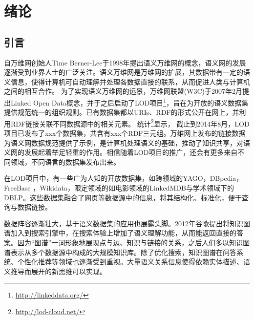 \chapter{绪论}
\label{cha:intro}

\section{引言}

自万维网创始人Time Berner-Lee于1998年提出语义万维网的概念\cite{berners1998semantic}，语义网的发展逐渐受到业界人士的广泛关注。语义万维网是万维网的扩展，其数据带有一定的语义信息，使得计算机可自动理解并处理各数据直接的联系，从而促进人类与计算机之间的相互合作。
为了实现语义万维网的远景，万维网联盟(W3C)于2007年2月提出Linked Open Data概念，并于之后启动了LOD项目\footnote{\url{http://linkeddata.org/}}，旨在为开放的语义数据集提供规范统一的组织规则。已有数据集都以URIs、RDF的形式公开在网上，并利用RDF链接关联不同数据源中的相关元素\cite{bizer2009linked}。
统计\footnote{\url{http://lod-cloud.net/}}显示，
截止到2014年8月，LOD项目已发布了xxx个数据集，共含有xxx个RDF三元组。万维网上发布的链接数据为语义网数据规范提供了示例，是计算机处理语义的基础，推动了知识共享，对语义网的发展起着举足轻重的作用。相信随着LOD项目的推广，还会有更多来自不同领域，不同语言的数据集发布出来。

在LOD项目中，有一些广为人知的开放数据集，如跨领域的YAGO\cite{suchanek2007yago,suchanek2008yago,hoffart2013yago2,mahdisoltani2014yago3}，DBpedia\cite{auer2007dbpedia,bizer2009dbpedia,lehmann2015dbpedia}，FreeBase \cite{bollacker2008freebase}，Wikidata\cite{vrandevcic2014wikidata,erxleben2014introducing}，限定领域的如电影领域的LinkedMDB\cite{hassanzadeh2009linked}与学术领域下的DBLP。这些数据集融合了网页等数据源中的信息，将其结构化、标准化，便于查询与数据链接。

数据阵容逐渐壮大，基于语义数据集的应用也展露头脚。2012年谷歌提出将知识图谱\cite{singhal2012introducing}加入到搜索引擎中，在搜索体验上增加了语义理解功能，从而能返回直接的答案。因为“图谱”一词形象地展现点与边、知识与链接的关系，之后人们多以知识图谱表示从多个数据源中构成的大规模知识库。除了优化搜索，知识图谱在问答系统\cite{yih2015semantic,yang2014joint}、个性化推荐\cite{kaminskas2012knowledge}等领域也逐渐受到重视。大量语义关系信息使得依赖实体描述、语义推导而展开的新思维可以实现。

